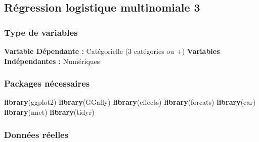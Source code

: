 \documentclass[
]{book}
\newenvironment{Shaded}{\begin{snugshade}}{\end{snugshade}}
\newcommand{\KeywordTok}[1]{\textcolor[rgb]{0.13,0.29,0.53}{\textbf{#1}}}
\newcommand{\NormalTok}[1]{#1}
\begin{document}
\hypertarget{ruxe9gression-logistique-multinomiale-3}{%
\subsection{Régression logistique multinomiale 3}\label{ruxe9gression-logistique-multinomiale-3}}

\hypertarget{type-de-variables-15}{%
\subsubsection{Type de variables}\label{type-de-variables-15}}

\textbf{Variable Dépendante :} Catégorielle (3 catégories ou +)
\textbf{Variables Indépendantes :} Numériques

\hypertarget{packages-nuxe9cessaires-15}{%
\subsubsection{Packages nécessaires}\label{packages-nuxe9cessaires-15}}

\begin{Shaded}
\begin{Highlighting}[]
\KeywordTok{library}\NormalTok{(ggplot2)}
\KeywordTok{library}\NormalTok{(GGally)}
\KeywordTok{library}\NormalTok{(effects)}
\KeywordTok{library}\NormalTok{(forcats)}
\KeywordTok{library}\NormalTok{(car)}
\KeywordTok{library}\NormalTok{(nnet)}
\KeywordTok{library}\NormalTok{(tidyr)}
\end{Highlighting}
\end{Shaded}

\hypertarget{donnuxe9es-ruxe9elles-15}{%
\subsubsection{Données réelles}\label{donnuxe9es-ruxe9elles-15}}
\end{document}
